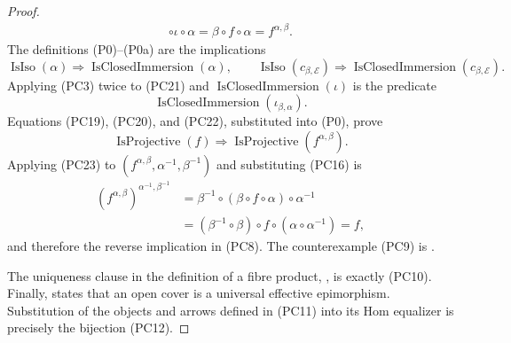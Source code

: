 \begin{proof}
\[\begin{aligned}
        \circ\iota\circ\alpha
       =\beta\circ f\circ\alpha
       =f^{\alpha,\beta}.
  \end{aligned}                                                  \tag{PC20}
  \]
  The definitions (P0)--(P0a) are the implications
  \[
    \operatorname{IsIso}(\alpha)
      \Longrightarrow\operatorname{IsClosedImmersion}(\alpha),
    \qquad
    \operatorname{IsIso}(c_{\beta,\mathcal E})
      \Longrightarrow
      \operatorname{IsClosedImmersion}(c_{\beta,\mathcal E}). \tag{PC21}
  \]
  Applying (PC3) twice to (PC21) and
  $\operatorname{IsClosedImmersion}(\iota)$ is the predicate
  \[
    \operatorname{IsClosedImmersion}(\iota_{\beta,\alpha}).   \tag{PC22}
  \]
  Equations (PC19), (PC20), and (PC22), substituted into (P0), prove
  \[
    \operatorname{IsProjective}(f)
      \Longrightarrow
    \operatorname{IsProjective}(f^{\alpha,\beta}).             \tag{PC23}
  \]
  Applying (PC23) to
  $(f^{\alpha,\beta},\alpha^{-1},\beta^{-1})$ and substituting (PC16) is
  \[
  \begin{aligned}
    (f^{\alpha,\beta})^{\alpha^{-1},\beta^{-1}}
      &=\beta^{-1}\circ(\beta\circ f\circ\alpha)
        \circ\alpha^{-1}\\
      &=(\beta^{-1}\circ\beta)\circ f\circ
        (\alpha\circ\alpha^{-1})
       =f,
  \end{aligned}
  \]
  and therefore the reverse implication in (PC8).  The counterexample (PC9) is
  \cite[\href{https://stacks.math.columbia.edu/tag/08J1}{Tag 08J1}]
  {stacks-project}.

  The uniqueness clause in the definition of a fibre product,
  \cite[\href{https://stacks.math.columbia.edu/tag/001V}{Tag 001V}]
  {stacks-project}, is exactly (PC10).  Finally,
  \cite[\href{https://stacks.math.columbia.edu/tag/023Q}{Tag 023Q}]
  {stacks-project} states that an open cover is a universal effective
  epimorphism.  Substitution of the objects and arrows defined in (PC11) into
  its Hom equalizer is precisely the bijection (PC12).
\end{proof}


